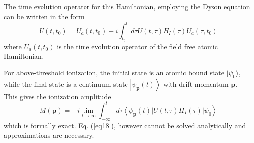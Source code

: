 \documentclass[11pt]{article}
\numberwithin{equation}{section}
\begin{document}
The time evolution operator for this Hamiltonian, employing the Dyson equation can be written in the form
\begin{equation}
    U(t,t_0) = U_a(t,t_0) - i \int_{t_0}^t d\tau U(t,\tau)H_I(\tau)U_a(\tau,t_0)
\end{equation}
where $U_a(t,t_0)$ is the time evolution operator of the field free atomic Hamiltonian. 
\par
For above-threshold ionization, the initial state is an atomic bound state $|\psi_0\rangle$, while the final state is a continuum state $\left|\psi_{\textbf{p}}(t)\right\rangle$ with drift momentum $\textbf{p}$. This gives the ionization amplitude
\begin{equation} \label{eq18}
    M(\textbf{p}) = -i \lim_{t\rightarrow \infty} \int_{-\infty}^t d\tau \left\langle\psi_{\textbf{p}}(t)|U(t,\tau)H_I(\tau)|\psi_0\right\rangle
\end{equation}
which is formally exact. Eq. (\ref{eq18}), however cannot be solved analytically and approximations are necessary.
\end{document}
